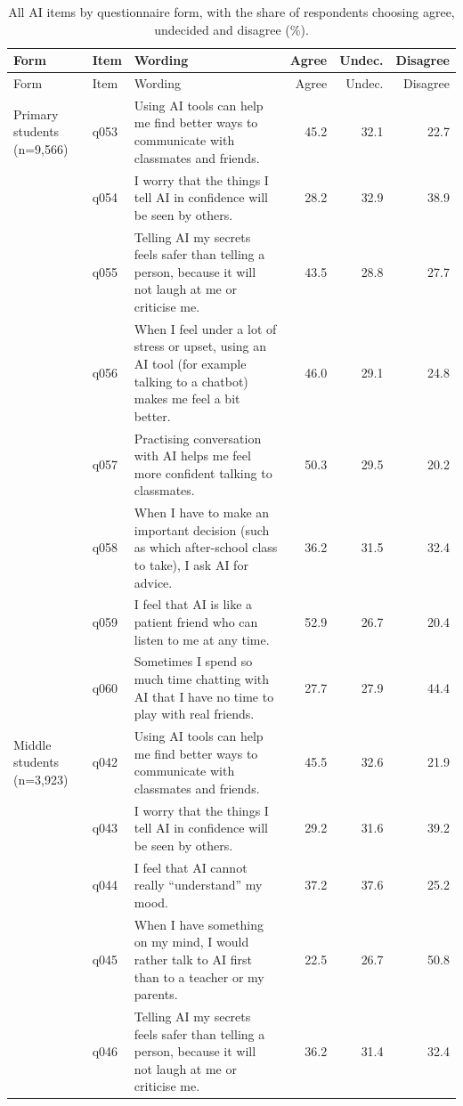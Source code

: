 \small
\setlength{\tabcolsep}{3pt}
\begin{longtable}{@{}p{}l p{} rrr@{}}
\caption{All AI items by questionnaire form, with the share of respondents choosing agree, undecided and disagree (\%).}\label{tab:items}\\
\toprule Form & Item & Wording & Agree & Undec. & Disagree \\ \midrule \endfirsthead
\toprule Form & Item & Wording & Agree & Undec. & Disagree \\ \midrule \endhead
\bottomrule \endfoot
Primary students (n=9,566) & q053 & Using AI tools can help me find better ways to communicate with classmates and friends. & 45.2 & 32.1 & 22.7 \\
 & q054 & I worry that the things I tell AI in confidence will be seen by others. & 28.2 & 32.9 & 38.9 \\
 & q055 & Telling AI my secrets feels safer than telling a person, because it will not laugh at me or criticise me. & 43.5 & 28.8 & 27.7 \\
 & q056 & When I feel under a lot of stress or upset, using an AI tool (for example talking to a chatbot) makes me feel a bit better. & 46.0 & 29.1 & 24.8 \\
 & q057 & Practising conversation with AI helps me feel more confident talking to classmates. & 50.3 & 29.5 & 20.2 \\
 & q058 & When I have to make an important decision (such as which after-school class to take), I ask AI for advice. & 36.2 & 31.5 & 32.4 \\
 & q059 & I feel that AI is like a patient friend who can listen to me at any time. & 52.9 & 26.7 & 20.4 \\
 & q060 & Sometimes I spend so much time chatting with AI that I have no time to play with real friends. & 27.7 & 27.9 & 44.4 \\
Middle students (n=3,923) & q042 & Using AI tools can help me find better ways to communicate with classmates and friends. & 45.5 & 32.6 & 21.9 \\
 & q043 & I worry that the things I tell AI in confidence will be seen by others. & 29.2 & 31.6 & 39.2 \\
 & q044 & I feel that AI cannot really ``understand'' my mood. & 37.2 & 37.6 & 25.2 \\
 & q045 & When I have something on my mind, I would rather talk to AI first than to a teacher or my parents. & 22.5 & 26.7 & 50.8 \\
 & q046 & Telling AI my secrets feels safer than telling a person, because it will not laugh at me or criticise me. & 36.2 & 31.4 & 32.4 \\

\end{longtable}
